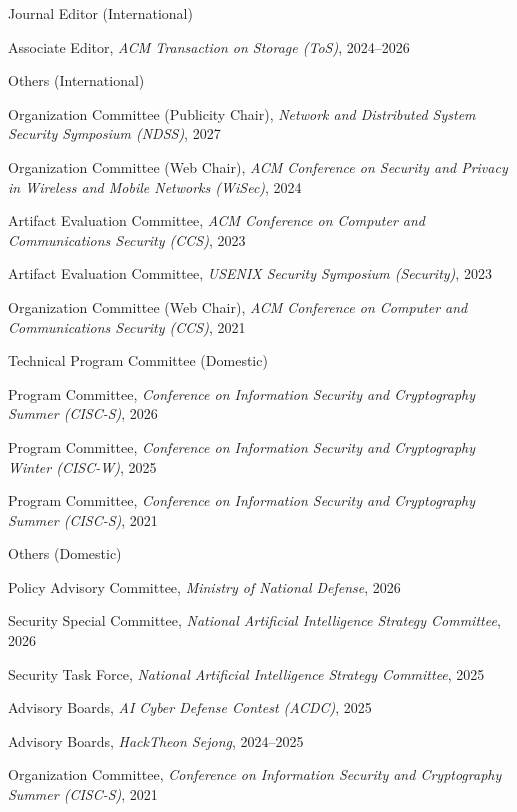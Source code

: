 \documentclass[11pt,letterpaper]{article}
\begin{document}
\begin{topic}{Journal Editor (International)}{}
  \item{Associate Editor, \emph{ACM Transaction on Storage (ToS)}, 2024--2026} %
\end{topic}

\begin{topic}{Others (International)}{}
  \item{Organization Committee (Publicity Chair), \emph{Network and Distributed System Security Symposium (NDSS)}, 2027}
  \item{Organization Committee (Web Chair), \emph{ACM Conference on Security and Privacy in Wireless and Mobile Networks (WiSec)}, 2024} %
  \item{Artifact Evaluation Committee, \emph{ACM Conference on Computer and Communications Security (CCS)}, 2023} %
  \item{Artifact Evaluation Committee, \emph{USENIX Security Symposium (Security)}, 2023} %
  \item{Organization Committee (Web Chair), \emph{ACM Conference on Computer and Communications Security (CCS)}, 2021} %
\end{topic}

\begin{topic}{Technical Program Committee (Domestic)}{}
  \item{Program Committee, \emph{Conference on Information Security and Cryptography Summer (CISC-S)}, 2026}
  \item{Program Committee, \emph{Conference on Information Security and Cryptography Winter (CISC-W)}, 2025}
  \item{Program Committee, \emph{Conference on Information Security and Cryptography Summer (CISC-S)}, 2021}
\end{topic}

\begin{topic}{Others (Domestic)}{}
  \item{Policy Advisory Committee, \emph{Ministry of National Defense}, 2026}
  \item{Security Special Committee, \emph{National Artificial Intelligence Strategy Committee}, 2026}
  \item{Security Task Force, \emph{National Artificial Intelligence Strategy Committee}, 2025} %
  \item{Advisory Boards, \emph{AI Cyber Defense Contest (ACDC)}, 2025}
  \item{Advisory Boards, \emph{HackTheon Sejong}, 2024--2025} %
  \item{Organization Committee, \emph{Conference on Information Security and Cryptography Summer (CISC-S)}, 2021} %
\end{topic}
\end{document}
